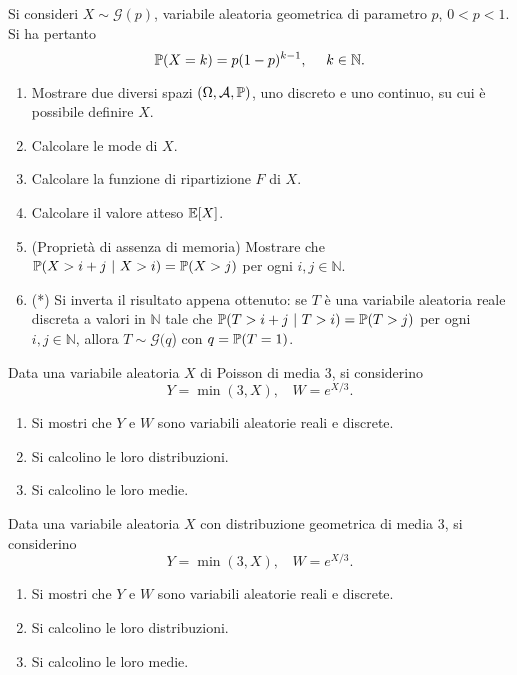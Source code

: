 Si consideri $X\sim \mathcal{G}( p)$, variabile aleatoria geometrica di parametro $p$, $0< p< 1$. Si ha pertanto
\begin{equation*}
\PP( X=k) =p( 1-p)^{k-1} ,\ \ \ \ k\in \mathbb{N} .
\end{equation*}
\begin{enumerate}
\item Mostrare due diversi spazi $( \Omega ,\mathcal{A} ,\mathbb{P})$, uno discreto e uno continuo, su cui è possibile definire $X$.
\item Calcolare le mode di $X$.
\item Calcolare la funzione di ripartizione $F$ di $X$.
\item Calcolare il valore atteso $\mathbb{E}[ X]$.
\item (Proprietà di assenza di memoria) Mostrare che $\mathbb{P}( X >i+j\ |\ X >i) =\mathbb{P}( X >j)$ per ogni $i,j\in \mathbb{N}$.
\item (*) Si inverta il risultato appena ottenuto: se $T$ è una variabile aleatoria reale discreta a valori in $\mathbb{N}$ tale che $\mathbb{P}( T >i+j\ |\ T >i) =\mathbb{P}( T >j)$ per ogni $i,j\in \mathbb{N}$, allora $T\sim \mathcal{G}( q$) con $q=\mathbb{P}( T=1)$.
\end{enumerate}

\Esercizio{}

Data una variabile aleatoria $X$ di Poisson di media $3$, si considerino
\begin{equation*}
Y=\min( 3,X) ,\ \ \ \ W=e^{X/3} .
\end{equation*}
\begin{enumerate}
\item Si mostri che $Y$ e $W$ sono variabili aleatorie reali e discrete.
\item Si calcolino le loro distribuzioni.
\item Si calcolino le loro medie.
\end{enumerate}

\Esercizio{}

Data una variabile aleatoria $X$ con distribuzione geometrica di media $3$, si considerino
\begin{equation*}
Y=\min( 3,X) ,\ \ \ \ W=e^{X/3} .
\end{equation*}
\begin{enumerate}
\item Si mostri che $Y$ e $W$ sono variabili aleatorie reali e discrete.
\item Si calcolino le loro distribuzioni.
\item Si calcolino le loro medie.
\end{enumerate}

